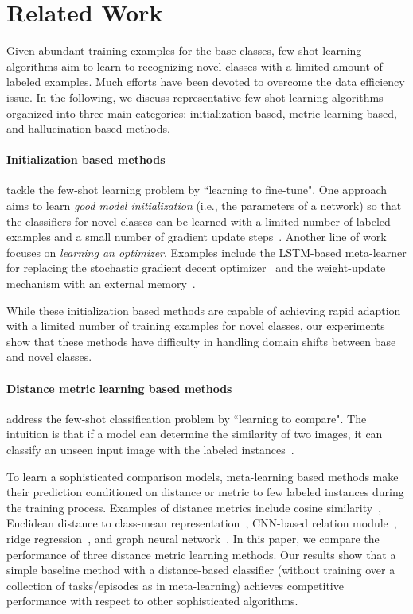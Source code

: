 \section{Related Work}
\label{sec:related}

Given abundant training examples for the base classes, few-shot learning algorithms aim to learn to recognizing novel classes with a limited amount of labeled examples. Much efforts have been devoted to overcome the data efficiency issue. In the following, we discuss representative few-shot learning algorithms organized into three main categories: initialization based, metric learning based, and hallucination based methods.

\paragraph{Initialization based methods} tackle the few-shot learning problem by ``learning to fine-tune". One approach aims to learn \emph{good model initialization} (i.e., the parameters of a network) so that the classifiers for novel classes can be learned with a limited number of labeled examples and a small number of gradient update steps~\cite{finn2017model,finn2018probabilistic,nichol2018reptile,rusu2018meta}. Another line of work focuses on \emph{learning an optimizer}. Examples include the LSTM-based meta-learner for replacing the stochastic gradient decent optimizer~\cite{ravi2017optimization} and the weight-update mechanism with an external memory~\cite{munkhdalai2017meta}.

While these initialization based methods are capable of achieving rapid adaption with a limited number of training examples for novel classes, our experiments show that these methods have difficulty in handling domain shifts between base and novel classes.

\paragraph{Distance metric learning based methods} address the few-shot classification problem by ``learning to compare". The intuition is that if a model can determine the similarity of two images, it can classify an unseen input image with the labeled instances~\cite{koch2015siamese}.

To learn a sophisticated comparison models, meta-learning based methods make their prediction conditioned on distance or metric to few labeled instances during the training process. Examples of distance metrics include cosine similarity~\cite{vinyals2016matching}, Euclidean distance to class-mean representation~\cite{snell2017prototypical}, CNN-based relation module~\cite{sung2018learning}, ridge regression~\cite{bertinetto2019meta}, and graph neural network~\cite{garcia2018few}. In this paper, we compare the performance of three distance metric learning methods. Our results show that a simple baseline method with a distance-based classifier (without training over a collection of tasks/episodes as in meta-learning) achieves competitive performance with respect to other sophisticated algorithms.


